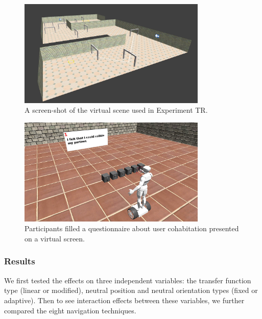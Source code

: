 \begin{figure}[htb]
  \centering
  \includegraphics[width=0.8\textwidth]{figures/ch4/t3}
  \caption{\label{fig:4_task3}A screen-shot of the virtual scene used in Experiment TR.}
\end{figure}

\begin{figure}[htb]
  \centering
  \includegraphics[width=0.8\textwidth]{figures/ch4/t3_q}
  \caption{\label{fig:4_task3_q}Participants filled a questionnaire about user cohabitation presented on a virtual screen.}
\end{figure}


\subsubsection{Results}
We first tested the effects on three independent variables: the transfer function type (linear or modified), neutral position and neutral orientation types (fixed or adaptive). Then to see interaction effects between these variables, we further compared the eight navigation techniques.

